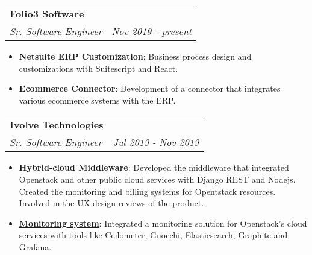 \documentclass[letterpaper,11pt]{article}
\makeatletter
\newcommand{\resumeItem}[2]{
\item\small{
	\textbf{#1}{: #2 \vspace{-2pt}}
}
}
\newcommand{\resumeSubheading}[4]{
\vspace{-1pt}\item
\begin{tabular*}{0.97\textwidth}{l@{\extracolsep{\fill}}r}
	\textbf{#1} & #2 \\
	\textit{\small#3} & \textit{\small #4} \\
\end{tabular*}\vspace{-5pt}
}
\newcommand{\resumeItemListStart}{\begin{itemize}}
\newcommand{\resumeItemListEnd}{\end{itemize}\vspace{-5pt}}
\makeatother
\begin{document}
\resumeSubheading
{Folio3 Software}{}
{Sr. Software Engineer}{Nov 2019 - present}
\resumeItemListStart
\resumeItem{Netsuite ERP Customization}
{Business process design and customizations with Suitescript and React.}
\resumeItem{Ecommerce Connector}
{Development of a connector that integrates various ecommerce systems with the ERP.}
\resumeItemListEnd
\resumeSubheading
{Ivolve Technologies}{}
{Sr. Software Engineer}{Jul 2019 - Nov 2019}
\resumeItemListStart
\resumeItem{Hybrid-cloud Middleware}
{Developed the middleware that integrated Openstack and other public cloud services with Django REST and Nodejs. Created the monitoring and billing systems for Opentstack resources. Involved in the UX design reviews of the product.}
\resumeItem{\href{http://bit.ly/siem-saqib}{Monitoring system}}
{Integrated a monitoring solution for Openstack's cloud services with tools like Ceilometer, Gnocchi, Elasticsearch, Graphite and Grafana.}

\resumeItemListEnd
\end{document}
